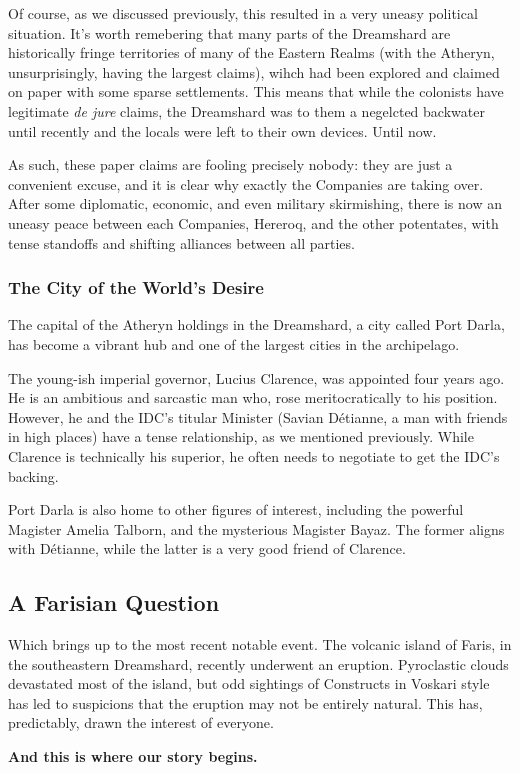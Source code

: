 Of course, as we discussed previously, this resulted in a very uneasy political situation. It's worth remebering that many parts of the Dreamshard are historically fringe territories of many of the Eastern Realms (with the Atheryn, unsurprisingly, having the largest claims), wihch had been explored and claimed on paper with some sparse settlements. This means that while the colonists have legitimate \textit{de jure} claims, the Dreamshard was to them a negelcted backwater until recently and the locals were left to their own devices. Until now.

As such, these paper claims are fooling precisely nobody: they are just a convenient excuse, and it is clear why exactly the Companies are taking over. After some diplomatic, economic, and even military skirmishing, there is now an uneasy peace between each Companies, Hereroq, and the other potentates, with tense standoffs and shifting alliances between all parties.


\subsubsection{The City of the World's Desire}

The capital of the Atheryn holdings in the Dreamshard, a city called Port Darla, has become a vibrant hub and one of the largest cities in the archipelago.

The young-ish imperial governor, Lucius Clarence, was appointed four years ago. He is an ambitious and sarcastic man who, rose meritocratically to his position. However, he and the IDC's titular Minister (Savian Détianne, a man with friends in high places) have a tense relationship, as we mentioned previously. While Clarence is technically his superior, he often needs to negotiate to get the IDC's backing.

Port Darla is also home to other figures of interest, including the powerful Magister Amelia Talborn, and the mysterious Magister Bayaz. The former aligns with Détianne, while the latter is a very good friend of Clarence.


\subsection{A Farisian Question}

Which brings up to the most recent notable event. The volcanic island of Faris, in the southeastern Dreamshard, recently underwent an eruption. Pyroclastic clouds devastated most of the island, but odd sightings of Constructs in Voskari style has led to suspicions that the eruption may not be entirely natural. This has, predictably, drawn the interest of everyone.

\vspace{0.5cm}

\textbf{And this is where our story begins.}